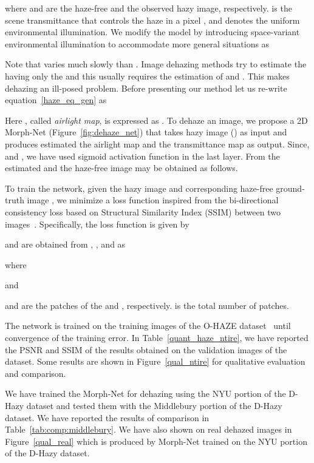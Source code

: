 \documentclass[12pt]{article}
\def\Figref#1{Figure~\ref{#1}}
\def\eqref#1{equation~\ref{#1}}
\begin{document}
where  and  are the haze-free and the observed hazy image, respectively.  is the scene transmittance that controls the haze in a pixel , and  denotes the uniform environmental illumination. We modify the model by introducing space-variant environmental illumination  to accommodate more general situations as 
 
Note that  varies much slowly than . 
Image dehazing methods try to estimate the  having only the  and this usually requires the estimation of  and . This makes dehazing an ill-posed problem. Before presenting our method let us re-write \eqref{haze_eq_gen} as 

Here , called \textit{airlight map}, is expressed as . To dehaze an image, we propose a 2D Morph-Net (\Figref{fig:dehaze_net}) that takes hazy image () as input and produces estimated the airlight map  and the transmittance map  as output. 
Since,  and , we have used sigmoid activation function in the last layer. From  the estimated  and  the haze-free image may be obtained as follows.

To train the network, given the hazy image  and corresponding haze-free ground-truth image , we minimize a loss function inspired from the bi-directional consistency loss \cite{mondal2018image} based on Structural Similarity Index (SSIM) between two images~\cite{wang2004image}. Specifically, the loss function is given by 

 and  are obtained from , ,  and  as

where 
 
and 
 
 and  are the  patches of the  and ,  respectively.  is the total number of patches.  

The network is trained on the training images of the O-HAZE dataset~\cite{ancuti2018haze} until convergence of the training error. In Table~\ref{quant_haze_ntire}, we have reported the PSNR and SSIM of the results obtained on the validation images of the dataset. Some results are shown in \Figref{qual_ntire} for qualitative evaluation and comparison. 


We have trained the Morph-Net for dehazing using the NYU portion of the D-Hazy dataset and tested them with  the Middlebury portion of the D-Hazy dataset. We have reported the results of comparison in Table~\ref{tab:comp:middlebury}. We have also shown on real dehazed images in Figure~\ref{qual_real} which is produced by Morph-Net trained on the NYU portion of the D-Hazy dataset.
\end{document}
